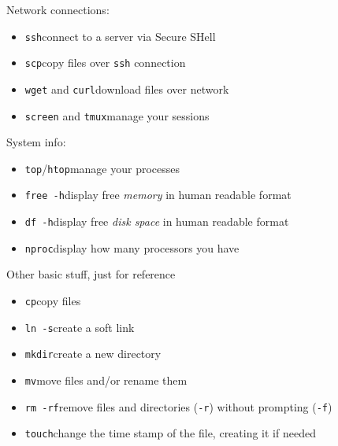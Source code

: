 \documentclass[10pt, aspectratio=169]{beamer}
\let\cmd=\lstinline
\begin{document}
\begin{frame}
  \vfill
  {\Large Network connections:}
  \vfill  
  \begin{itemize}
    \item \cmd{ssh}\quad connect to a server via Secure SHell
    \item \cmd{scp}\quad copy files over \texttt{ssh} connection
    \item \cmd{wget} and \cmd{curl}\quad download files over network
    \item \cmd{screen} and \cmd{tmux}\quad manage your sessions
  \end{itemize}
  \vfill  
  {\Large System info:}
  \vfill
  \begin{itemize}
    \item \cmd{top}/\cmd{htop}\quad manage your processes
    \item \cmd{free -h}\quad display free \emph{memory} in human readable format
    \item \cmd{df -h}\quad display free \emph{disk space} in human readable format
    \item \cmd{nproc}\quad display how many processors you have
  \end{itemize}
  \vfill
\end{frame}

\begin{frame}
  \vfill
  {\huge Other basic stuff, just for reference}
  \vfill
  \begin{itemize}
    \item \cmd{cp}\quad copy files
    \item \cmd{ln -s}\quad create a soft link
    \item \cmd{mkdir}\quad create a new directory
    \item \cmd{mv}\quad move files and/or rename them
    \item \cmd{rm -rf}\quad remove files and directories (\cmd{-r}) without prompting (\cmd{-f})
    \item \cmd{touch}\quad change the time stamp of the file, creating it if needed
  \end{itemize}
  \vfill
\end{frame}
\end{document}
